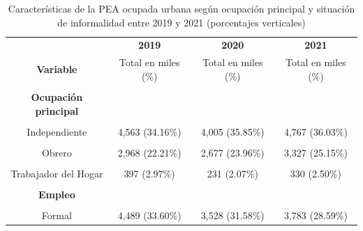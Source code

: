 \documentclass[
  letterpaper,
  12pt,
  oneside,
  spanish,
  doublespacing,
  headsepline,
  parskip]{MastersDoctoralThesis}
\begin{document}
\hypertarget{tbl-peaocupinf}{}
\begin{table}[H]
\caption{\label{tbl-peaocupinf}Características de la PEA ocupada urbana según ocupación principal y
situación de informalidad entre 2019 y 2021 (porcentajes verticales) }\tabularnewline

\centering\begingroup\fontsize{10}{12}\selectfont

\begin{tabular}{cccc}
\toprule
\multicolumn{1}{c}{ } & \multicolumn{1}{c}{\textbf{2019}} & \multicolumn{1}{c}{\textbf{2020}} & \multicolumn{1}{c}{\textbf{2021}} \\
\cmidrule(l{3pt}r{3pt}){2-2} \cmidrule(l{3pt}r{3pt}){3-3} \cmidrule(l{3pt}r{3pt}){4-4}
\textbf{Variable} & Total en miles (\%) & Total en miles (\%) & Total en miles (\%)\\
\midrule
\cellcolor{gray!6}{\textbf{Nacional}} & \cellcolor{gray!6}{13,360 (100.00\%)} & \cellcolor{gray!6}{11,172 (100.00\%)} & \cellcolor{gray!6}{13,229 (100.00\%)}\\
\textbf{Ocupación principal} &  &  & \\
\cellcolor{gray!6}{Empleador} & \cellcolor{gray!6}{570 (4.27\%)} & \cellcolor{gray!6}{345 (3.09\%)} & \cellcolor{gray!6}{465 (3.51\%)}\\
Independiente & 4,563 (34.16\%) & 4,005 (35.85\%) & 4,767 (36.03\%)\\
\cellcolor{gray!6}{Empleado} & \cellcolor{gray!6}{4,065 (30.42\%)} & \cellcolor{gray!6}{3,056 (27.35\%)} & \cellcolor{gray!6}{3,479 (26.29\%)}\\
\addlinespace
Obrero & 2,968 (22.21\%) & 2,677 (23.96\%) & 3,327 (25.15\%)\\
\cellcolor{gray!6}{Familiar No Remunerado} & \cellcolor{gray!6}{774 (5.79\%)} & \cellcolor{gray!6}{830 (7.43\%)} & \cellcolor{gray!6}{833 (6.30\%)}\\
Trabajador del Hogar & 397 (2.97\%) & 231 (2.07\%) & 330 (2.50\%)\\
\cellcolor{gray!6}{Otro} & \cellcolor{gray!6}{23 (0.18\%)} & \cellcolor{gray!6}{27 (0.24\%)} & \cellcolor{gray!6}{30 (0.22\%)}\\
\textbf{Empleo} &  &  & \\
\addlinespace
\cellcolor{gray!6}{Informal} & \cellcolor{gray!6}{8,872 (66.40\%)} & \cellcolor{gray!6}{7,643 (68.42\%)} & \cellcolor{gray!6}{9,446 (71.41\%)}\\
Formal & 4,489 (33.60\%) & 3,528 (31.58\%) & 3,783 (28.59\%)\\
\bottomrule
\end{tabular}
\endgroup{}
\end{table}
\end{document}
